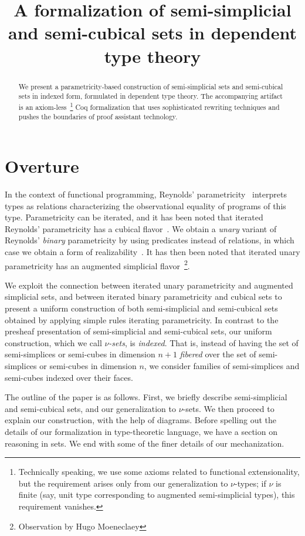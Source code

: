 \documentclass[10pt]{art.cls/art}
\title{A formalization of semi-simplicial and semi-cubical sets in dependent type theory}
\author{\IEEEauthorblockN{Hugo Herbelin \\ and Ramkumar Ramachandra} \IEEEauthorblockA{Université Paris Cité, Inria, CNRS, IRIF, Paris}}
\begin{document}
\maketitle
\begin{abstract}
  We present a parametricity-based construction of semi-simplicial sets and semi-cubical sets in indexed form, formulated in dependent type theory. The accompanying artifact is an axiom-less~\footnote{Technically speaking, we use some axioms related to functional extensionality, but the requirement arises only from our generalization to $\nu$-types; if $\nu$ is finite (say, unit type corresponding to augmented semi-simplicial types), this requirement vanishes.} Coq formalization that uses sophisticated rewriting techniques and pushes the boundaries of proof assistant technology.
\end{abstract}

\section{Overture}
In the context of functional programming, Reynolds' parametricity~\cite{reynolds72} interprets types as relations characterizing the observational equality of programs of this type. Parametricity can be iterated, and it has been noted that iterated Reynolds' parametricity has a cubical flavor~\cite{johann17,altenkirch15,moulin16}. We obtain a \emph{unary} variant of Reynolds' \emph{binary} parametricity by using predicates instead of relations, in which case we obtain a form of realizability~\cite{bernardy12,moulin16}. It has then been noted that iterated unary parametricity has an augmented simplicial flavor~\footnote{Observation by Hugo Moeneclaey}.

We exploit the connection between iterated unary parametricity and augmented simplicial sets, and between iterated binary parametricity and cubical sets to present a uniform construction of both semi-simplicial and semi-cubical sets obtained by applying simple rules iterating parametricity. In contrast to the presheaf presentation of semi-simplicial and semi-cubical sets, our uniform construction, which we call \emph{$\nu$-sets}, is \emph{indexed}. That is, instead of having the set of semi-simplices or semi-cubes in dimension $n+1$
\emph{fibered} over the set of semi-simplices or semi-cubes in dimension $n$, we consider families of semi-simplices and semi-cubes indexed over their faces.

The outline of the paper is as follows. First, we briefly describe semi-simplicial and semi-cubical sets, and our generalization to $\nu$-sets. We then proceed to explain our construction, with the help of diagrams. Before spelling out the details of our formalization in type-theoretic language, we have a section on reasoning in sets. We end with some of the finer details of our mechanization.
\end{document}
